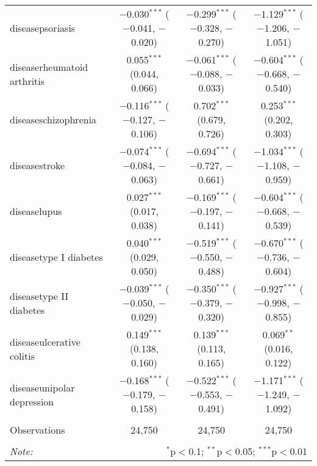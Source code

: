 \begin{table}[!htbp]
\begin{tabular}{@{\extracolsep{5pt}}lccc}
  diseasepsoriasis & $-$0.030$^{***}$ ($-$0.041, $-$0.020) & $-$0.299$^{***}$ ($-$0.328, $-$0.270) & $-$1.129$^{***}$ ($-$1.206, $-$1.051) \\ 
  diseaserheumatoid arthritis & 0.055$^{***}$ (0.044, 0.066) & $-$0.061$^{***}$ ($-$0.088, $-$0.033) & $-$0.604$^{***}$ ($-$0.668, $-$0.540) \\ 
  diseaseschizophrenia & $-$0.116$^{***}$ ($-$0.127, $-$0.106) & 0.702$^{***}$ (0.679, 0.726) & 0.253$^{***}$ (0.202, 0.303) \\ 
  diseasestroke & $-$0.074$^{***}$ ($-$0.084, $-$0.063) & $-$0.694$^{***}$ ($-$0.727, $-$0.661) & $-$1.034$^{***}$ ($-$1.108, $-$0.959) \\ 
  diseaselupus & 0.027$^{***}$ (0.017, 0.038) & $-$0.169$^{***}$ ($-$0.197, $-$0.141) & $-$0.604$^{***}$ ($-$0.668, $-$0.539) \\ 
  diseasetype I diabetes & 0.040$^{***}$ (0.029, 0.050) & $-$0.519$^{***}$ ($-$0.550, $-$0.488) & $-$0.670$^{***}$ ($-$0.736, $-$0.604) \\ 
  diseasetype II diabetes & $-$0.039$^{***}$ ($-$0.050, $-$0.029) & $-$0.350$^{***}$ ($-$0.379, $-$0.320) & $-$0.927$^{***}$ ($-$0.998, $-$0.855) \\ 
  diseaseulcerative colitis & 0.149$^{***}$ (0.138, 0.160) & 0.139$^{***}$ (0.113, 0.165) & 0.069$^{**}$ (0.016, 0.122) \\ 
  diseaseunipolar depression & $-$0.168$^{***}$ ($-$0.179, $-$0.158) & $-$0.522$^{***}$ ($-$0.553, $-$0.491) & $-$1.171$^{***}$ ($-$1.249, $-$1.092) \\ 
 \hline \\[-1.8ex] 
Observations & 24,750 & 24,750 & 24,750 \\ 
\hline 
\hline \\[-1.8ex] 
\textit{Note:}  & \multicolumn{3}{r}{$^{*}$p$<$0.1; $^{**}$p$<$0.05; $^{***}$p$<$0.01} \\ 
\end{tabular} 
\end{table} 
